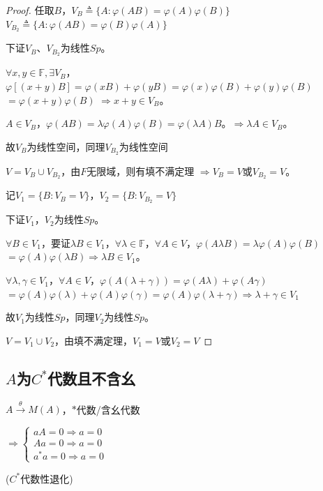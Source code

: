 \documentclass[lang=cn,a4paper,newtx,section]{elegantbook}
\begin{document}
\begin{proof}
  任取$B$，$V_B \triangleq \{A : \varphi(AB) = \varphi(A)\varphi(B)\}$
   \quad $V_{B_2} \triangleq \{A : \varphi(AB) = \varphi(B)\varphi(A)\}$
  
  下证$V_B$、$V_{B_2}$为线性$Sp$。
  
  $\forall x,y \in \mathbb{F}, \exists V_B$，$\varphi[(x + y)B] = \varphi(xB) + \varphi(yB) = \varphi(x)\varphi(B) + \varphi(y)\varphi(B)$
  $= \varphi(x + y)\varphi(B)$
   $\Rightarrow x + y \in V_B$。
  
  $A \in V_B$，$\varphi(AB) = \lambda\varphi(A)\varphi(B) = \varphi(\lambda A)B$。$\Rightarrow \lambda A \in V_B$。
  
  故$V_B$为线性空间，同理$V_{B_2}$为线性空间
  
  $V = V_B \cup V_{B_2}$，由$F$无限域，则有填不满定理
  $\Rightarrow V_B = V$或$V_{B_2} = V$。
  
  记$V_1 = \{B : V_B = V\}$，$V_2 = \{B : V_{B_2} = V\}$
  
  下证$V_1$，$V_2$为线性$Sp$。
  
  $\forall B \in V_1$，要证$\lambda B \in V_1$，$\forall \lambda \in \mathbb{F}$，$\forall A \in V$，$\varphi(A\lambda B) = \lambda\varphi(A)\varphi(B)$
   $= \varphi(A)\varphi(\lambda B) \Rightarrow \lambda B \in V_1$。
  
  $\forall \lambda, \gamma \in V_1$，$\forall A \in V$，$\varphi(A(\lambda + \gamma)) = \varphi(A\lambda) + \varphi(A\gamma)$
  $= \varphi(A)\varphi(\lambda) + \varphi(A)\varphi(\gamma) = \varphi(A)\varphi(\lambda + \gamma) \Rightarrow \lambda + \gamma \in V_1$
  
  故$V_1$为线性$Sp$，同理$V_2$为线性$Sp$。
  
  $V = V_1 \cup V_2$，由填不满定理，$V_1 = V$或$V_2 = V$
\end{proof}

\subsection{ $A$为$C^*$代数且不含幺}

$A \xrightarrow{\theta} M(A)$，$*$代数/含幺代数

$\Rightarrow \begin{cases}
  aA = 0 \Rightarrow a = 0 \\
  Aa = 0 \Rightarrow a = 0 \\
  a^*a = 0 \Rightarrow a = 0
\end{cases}$

($C^*$代数性退化)
\end{document}

